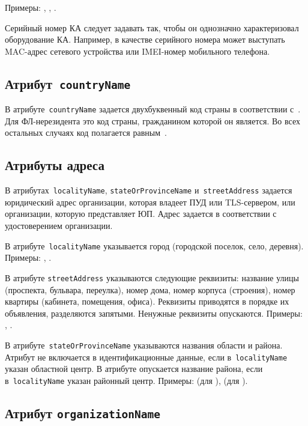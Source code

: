 Примеры: , 
, 
.

Серийный номер КА следует задавать так, чтобы он однозначно 
характеризовал оборудование КА. Например, в качестве серийного номера 
может выступать MAC-адрес сетевого устройства или IMEI-номер мобильного 
телефона. 

\subsection{Атрибут~\texttt{countryName}}\label{ENTITIES.Id.C}

В атрибуте~\texttt{countryName} задается двухбуквенный код страны
в соответствии с~\cite{CountryCodes}. 
%
Для ФЛ-нерезидента это код страны, гражданином которой он является.
Во всех остальных случаях код полагается равным~.

\subsection{Атрибуты адреса}\label{ENTITIES.Id.L}

В атрибутах~\texttt{localityName}, \texttt{stateOrProvinceName} 
и~\texttt{streetAddress} задается юридический адрес организации,
которая владеет ПУД или TLS-сервером, или организации, которую 
представляет ЮП.
%
Адрес задается в соответствии с удостоверением организации. 

В атрибуте~\texttt{localityName} указывается город (городской поселок, 
село, деревня). Примеры: , .

В атрибуте \texttt{streetAddress} указываются следующие реквизиты:
название улицы (проспекта, бульвара, переулка), номер дома, 
номер корпуса (строения), номер квартиры (кабинета, помещения, офиса). 
Реквизиты приводятся в порядке их объявления, разделяются запятыми. 
Ненужные реквизиты опускаются. 
%
Примеры: 
,
.

В атрибуте~\texttt{stateOrProvinceName} указываются названия области и района.
Атрибут не включается в идентификационные данные, если в~\texttt{localityName}
указан областной центр.
В атрибуте опускается название района, если в~\texttt{localityName}
указан районный центр.
Примеры: 
 (для ),
 (для ).

\subsection{Атрибут \texttt{organizationName}}\label{ENTITIES.Id.O}

